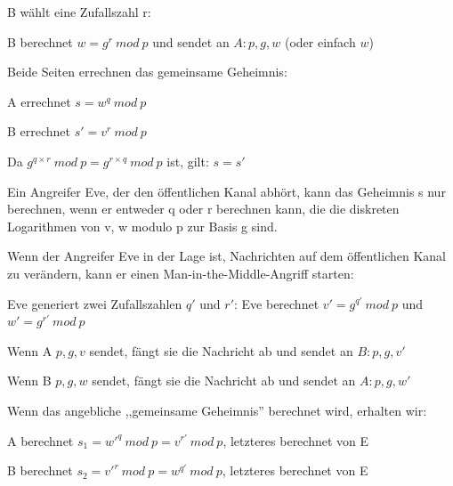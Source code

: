 \documentclass[a4paper]{article}
\begin{document}
\begin{multicols}{3}
\begin{itemize*}
\begin{itemize*}
\begin{itemize*}
                  \end{itemize*}
                  \item B wählt eine Zufallszahl r:
                  \begin{itemize*}
                        \item B berechnet $w=g^r\ mod\ p$ und sendet an $A:{p,g,w}$ (oder einfach ${w}$)
                  \end{itemize*}
                  \item Beide Seiten errechnen das gemeinsame Geheimnis:
                  \begin{itemize*}
                        \item A errechnet $s=w^q\ mod\ p$
                        \item B errechnet $s'=v^r\ mod\ p$
                        \item Da $g^{q\times r}\ mod\ p = g^{r \times q}\ mod\ p$ ist, gilt: $s=s'$
                  \end{itemize*}
                  \item Ein Angreifer Eve, der den öffentlichen Kanal abhört, kann das Geheimnis s nur berechnen, wenn er entweder q oder r berechnen kann, die die diskreten Logarithmen von v, w modulo p zur Basis g sind.
            \end{itemize*}
            \item Wenn der Angreifer Eve in der Lage ist, Nachrichten auf dem
            öffentlichen Kanal zu verändern, kann er einen
            Man-in-the-Middle-Angriff starten:
            \begin{itemize*}
                  \item Eve generiert zwei Zufallszahlen $q'$ und $r'$: Eve berechnet $v'=g^{q'}\ mod\ p$ und $w'=g^{r'}\ mod\ p$
                  \item Wenn A ${p,g,v}$ sendet, fängt sie die Nachricht ab und sendet an $B:{p,g,v'}$
                  \item Wenn B ${p,g,w}$ sendet, fängt sie die Nachricht ab und sendet an $A:{p,g,w'}$
                  \item Wenn das angebliche ,,gemeinsame Geheimnis'' berechnet wird, erhalten wir:
                  \begin{itemize*}
                        \item A berechnet $s_1=w'^q\ mod\ p = v^{r'}\ mod\ p$, letzteres berechnet von E
                        \item B berechnet $s_2=v'^r\ mod\ p = w^{q'}\ mod\ p$, letzteres berechnet von E

\end{itemize*}
\end{itemize*}
\end{itemize*}
\end{multicols}
\end{document}
